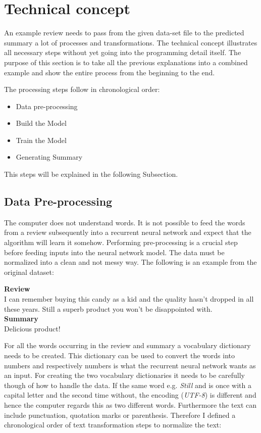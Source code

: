 \section{Technical concept}\label{ss:tc}

An example review needs to pass from the given data-set file to the predicted summary a lot of processes and transformations. The technical concept illustrates all necessary steps without yet going into the programming detail itself. The purpose of this section is to take all the previous explanations into a combined example and show the entire process from the beginning to the end. 

The processing steps follow in chronological order:

\begin{itemize}
	\item Data pre-processing
	\item Build the Model
	\item Train the Model
	\item Generating Summary
\end{itemize}

This steps will be explained in the following Subsection.

\subsection{Data Pre-processing}\label{ss:preprop}

The computer does not understand words. It is not possible to feed the words from a review subsequently into a recurrent neural network and expect that the algorithm will learn it somehow. Performing pre-processing is a crucial step before feeding inputs into the neural network model. The data must be normalized into a clean and not messy way. The following is an example from the original dataset:

\begin{tcolorbox}
	\textbf{Review} \\
	I can remember buying this candy as a kid and the quality hasn't dropped in all these years. Still a superb product you won't be disappointed with. \\
	
	\textbf{Summary} \\
	Delicious product!
\end{tcolorbox}

For all the words occurring in the review and summary a vocabulary dictionary needs to be created. This dictionary can be used to convert the words into numbers and respectively numbers is what the recurrent neural network wants as an input. For creating the two vocabulary dictionaries it needs to be carefully though of how to handle the data. If the same word e.g. \textit{Still} and  is once with a capital letter and the second time without, the encoding (\textit{UTF-8}) is different and hence the computer regards this as two different words. Furthermore the text can include punctuation, quotation marks or parenthesis. Therefore I defined a chronological order of text transformation steps to normalize the text:

